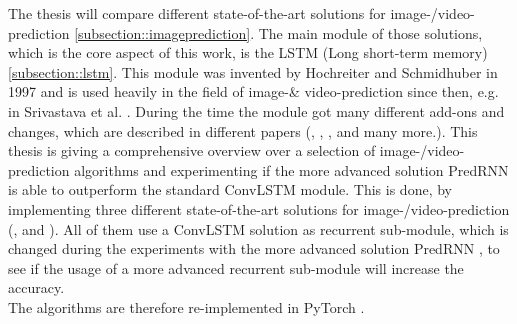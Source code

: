 The thesis will compare different state-of-the-art solutions for image-/video-prediction \ref{subsection::imageprediction}.
The main module of those solutions, which is the core aspect of this work, is the LSTM (Long short-term memory) \ref{subsection::lstm}.
This module was invented by Hochreiter and Schmidhuber  \cite{Hochreiter1997} in 1997 and is used heavily in the field of image-\& video-prediction since then, e.g. in Srivastava et al. 
\cite{Srivastava2015}.
During the time the module got many different add-ons and changes, which are described in different papers (\cite{Patraucean2015}, \cite{Lotter2016}, \cite{Wang2017}, \cite{Wang2018} and many more.). 
This thesis is giving a comprehensive overview over a selection of image-/video-prediction algorithms and experimenting if the more advanced solution PredRNN \cite{Wang2017} is able to outperform the standard ConvLSTM module. This is done, by implementing
three different state-of-the-art solutions for image-/video-prediction (\cite{Shi2015}, \cite{Patraucean2015} and \cite{Lotter2016}).
All of them use a ConvLSTM solution as recurrent sub-module, which is changed during the experiments
with the more advanced solution PredRNN \cite{Wang2017}, to see if the usage of a more advanced recurrent sub-module will increase the accuracy.\\
The algorithms are therefore re-implemented in PyTorch \cite{Paszke2019}.
